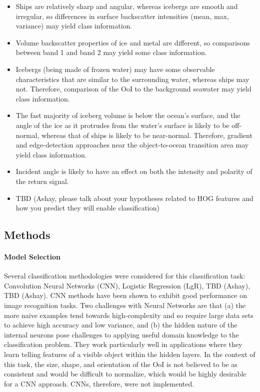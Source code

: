 \documentclass[fleqn,10pt]{SelfArx} %
\begin{document}
\begin{itemize}
	\item Ships are relatively sharp and angular, whereas icebergs are smooth and irregular, so differences in surface backscatter intensities (mean, max, variance) may yield class information.
	\item Volume backscatter properties of ice and metal \cite{howell} are different, so comparisons between band 1 and band 2 may yield some class information.  
	\item Icebergs (being made of frozen water) may have some observable characteristics that are similar to the surrounding water, whereas ships may not.  Therefore, comparison of the OoI to the background seawater may yield class information.
	\item The fast majority of iceberg volume is below the ocean's surface, and the angle of the ice as it protrudes from the water's surface is likely to be off-normal, whereas that of ships is likely to be near-normal.  Therefore, gradient and edge-detection approaches near the object-to-ocean transition area may yield class information.
	\item Incident angle is likely to have an effect on both the intensity and polarity of the return signal. \cite{makynen}
	\item TBD (Ashay, please talk about your hypotheses related to HOG features and how you predict they will enable classification)
\end{itemize}

\subsection{Methods}

\paragraph{Model Selection} Several classification methodologies were considered for this classification task: Convolution Neural Networks (CNN), Logistic Regression (LgR), TBD (Ashay), TBD (Ashay).  CNN methods have been shown to exhibit good performance on image recognition tasks. \cite{NIPS2012_4824} \cite{behnke}  Two challenges with Neural Networks are that (a) the more naive examples tend towards high-complexity and so require large data sets to achieve high accuracy and low variance, and (b) the hidden nature of the internal neurons pose challenges to applying useful domain knowledge to the classification problem.  They work particularly well in applications where they learn telling features of a visible object within the hidden layers.  In the context of this task, the size, shape, and orientation of the OoI is not believed to be as consistent and would be difficult to normalize, which would be highly desirable for a CNN approach.  CNNs, therefore, were not implemented. \cite{lecun}
\end{document}

